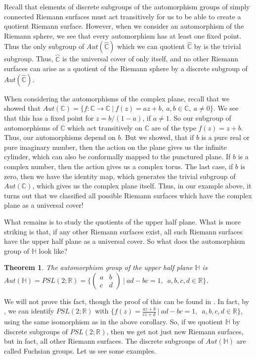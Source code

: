 \documentclass[11pt]{report}
\newtheorem{thm}{Theorem}[section]
\theoremstyle{definition}
\begin{document}
Recall that elements of discrete subgroups of the automorphism groups of simply connected Riemann surfaces must act transitively for us to be able to create a quotient Riemann surface. However, when we consider an automorphism of the Riemann sphere, we see that every automorphism has at least one fixed point. Thus the only subgroup of $Aut(\widehat{\mathbb{C}})$ which we can quotient $\widehat{\mathbb{C}}$ by is the trivial subgroup. Thus, $\widehat{\mathbb{C}}$ is the universal cover of only itself, and no other Riemann surfaces can arise as a quotient of the Riemann sphere by a discrete subgroup of $Aut(\widehat{\mathbb{C}})$.

When considering the automorphisms of the complex plane, recall that we showed that $Aut(\mathbb{C})= \{f:\mathbb{C}\rightarrow \mathbb{C} \ \vert \ f(z) = az + b, \ a,b\in\mathbb{C}, \ a \neq 0\}$. We see that this has a fixed point for $z = b/(1-a)$, if $a \neq 1$. So our subgroup of automorphisms of $\mathbb{C}$ which act transitively on $\mathbb{C}$ are of the type $f(z) = z + b$. Thus, our automorphisms depend on $b$. But we showed, that if $b$ is a pure real or pure imaginary number, then the action on the plane gives us the infinite cylinder, which can also be conformally mapped to the punctured plane. If $b$ is a complex number, then the action gives us a complex torus. The last case, if $b$ is zero, then we have the identity map, which generates the trivial subgroup of $Aut(\mathbb{C})$, which gives us the complex plane itself. Thus, in our example above, it turns out that we classified all possible Riemann surfaces which have the complex plane as a universal cover!

What remains is to study the quotients of the upper half plane. What is more striking is that, if any other Riemann surfaces exist, all such Riemann surfaces have the upper half plane as a universal cover. So what does the automorphism group of $\mathbb{H}$ look like?
\begin{thm}
  The automorphism group of the upper half plane $\mathbb{H}$ is ~\\ $Aut(\mathbb{H})=PSL(2;\mathbb{R}) = \Bigg\{ \begin{pmatrix} a & b\\ c & d \end{pmatrix} \ \Bigg\vert \ ad-bc = 1, \enspace a, b, c ,d \in \mathbb{\mathbb{R}}\Bigg\}$.
\end{thm} 
We will not prove this fact, though the proof of this can be found in \cite[(p.201, Theorem 4.17.3 (iii))]{comfun}. In fact, by \cite[(p.32, Theorem 2.9.1)]{comfun}, we can identify $PSL(2;\mathbb{R})$ with $\bigl\{f(z) = \frac{az+b}{cz+d}\ \vert \ ad-bc = 1, \enspace a, b, c ,d \in \mathbb{R}\bigr\}$, using the same isomorphism as in the above corollary. So, if we quotient $\mathbb{H}$ by discrete subgroups of $PSL(2;\mathbb{R})$, then we get not just new Riemann surfaces, but in fact, all other Riemann surfaces. The discrete subgroups of $Aut(\mathbb{H})$ are called Fuchsian groups. Let us see some examples.
\end{document}
